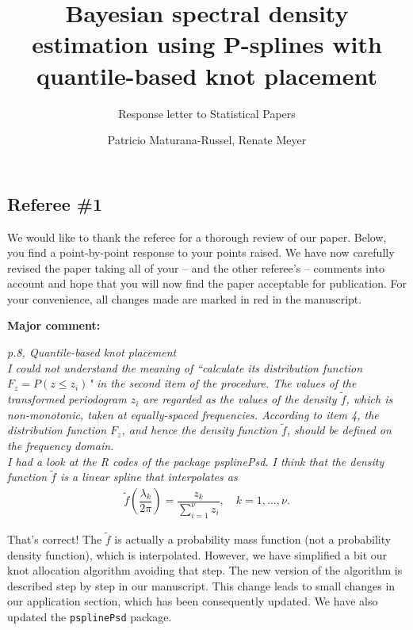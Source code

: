 \documentclass{scrartcl}
\title{Bayesian spectral density estimation using P-splines with quantile-based knot placement}
\subtitle{Response letter to Statistical Papers}
\author{Patricio Maturana-Russel, Renate Meyer}
\newcommand{\refereeQuote}{\textit }
\newcommand{\response}{}
\begin{document}
\maketitle\thispagestyle{empty}




\subsection*{Referee \#1}

\response{We would like to thank the referee for a thorough review of our paper. Below, you find a point-by-point response to your points raised. We have now carefully revised the paper taking all of your -- and the other referee's -- comments into account and hope that you will now find the paper acceptable for publication. For your convenience, all changes made are marked in red in the manuscript.} 

\textbf{Major comment:}

\refereeQuote{p.8, Quantile-based knot placement\\
I could not understand the meaning of ``calculate its distribution function $F_z = P(z \leq z_i)$" in the second item of the procedure.  The values of the transformed periodogram $z_i$ are regarded as the values of the density $\tilde{f}$, which is non-monotonic, taken at equally-spaced frequencies.  According to item 4, the distribution function $F_z$, and hence the density function $\tilde{f}$, should be defined on the frequency domain. \\
I had a look at the R codes of the package psplinePsd. I think that the density function $\tilde{f}$ is a linear spline that interpolates as
\begin{align*}
\tilde{f} \left(\dfrac{\lambda_k}{2\pi}\right) = \dfrac{z_k}{\sum_{i=1}^{\nu}z_i}, \quad k=1,\dots,\nu.
\end{align*}
}

\response{That's correct!  The $\widetilde{f}$ is actually a probability mass function (not a probability density function), which is interpolated.  However, we have simplified a bit our knot allocation algorithm avoiding that step.  The new version of the algorithm is described step by step in our manuscript.  This change leads to small changes in our application section, which has been consequently updated.  We have also updated the \texttt{psplinePsd} package.}\bigskip 
\end{document}
